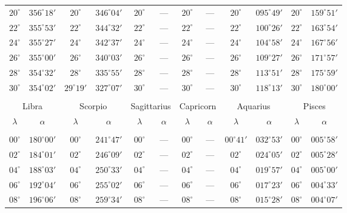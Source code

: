 \begin{table}[!h]
{\begin{tabular}{cc|cc|cc|cc|cc|cc}
$20^\circ$ & $356^\circ18'$ & $20^\circ$ & $346^\circ04'$ & $20^\circ$ & --- & $20^\circ$ & --- & $20^\circ$ & $095^\circ49'$ & $20^\circ$ & $159^\circ51'$\\
$22^\circ$ & $355^\circ53'$ & $22^\circ$ & $344^\circ32'$ & $22^\circ$ & --- & $22^\circ$ & --- & $22^\circ$ & $100^\circ26'$ & $22^\circ$ & $163^\circ54'$\\
$24^\circ$ & $355^\circ27'$ & $24^\circ$ & $342^\circ37'$ & $24^\circ$ & --- & $24^\circ$ & --- & $24^\circ$ & $104^\circ58'$ & $24^\circ$ & $167^\circ56'$\\
$26^\circ$ & $355^\circ00'$ & $26^\circ$ & $340^\circ03'$ & $26^\circ$ & --- & $26^\circ$ & --- & $26^\circ$ & $109^\circ27'$ & $26^\circ$ & $171^\circ57'$\\
$28^\circ$ & $354^\circ32'$ & $28^\circ$ & $335^\circ55'$ & $28^\circ$ & --- & $28^\circ$ & --- & $28^\circ$ & $113^\circ51'$ & $28^\circ$ & $175^\circ59'$\\
$30^\circ$ & $354^\circ02'$ & $29^\circ19'$ & $327^\circ07'$  & $30^\circ$ & --- & $30^\circ$ & --- & $30^\circ$ & $118^\circ13'$ & $30^\circ$ & $180^\circ00'$\\
\multicolumn{12}{c}{}\\
\multicolumn{2}{c}{Libra}\vline & \multicolumn{2}{c}{Scorpio} \vline& \multicolumn{2}{c}{Sagittarius} \vline& \multicolumn{2}{c}{Capricorn}\vline &
\multicolumn{2}{c}{Aquarius}\vline & \multicolumn{2}{c}{Pisces}\\\hline
$\lambda$& $\alpha$& $\lambda$& $\alpha$& $\lambda$& $\alpha$& $\lambda$& $\alpha$& $\lambda$& $\alpha$& $\lambda$& $\alpha$\\\hline
&&&&&&&&&&&\\[-2ex]
$00^\circ$ & $180^\circ00'$ & $00^\circ$ & $241^\circ47'$ & $00^\circ$ & --- & $00^\circ$ & --- &  $00^\circ41'$ & $032^\circ53'$ & $00^\circ$ & $005^\circ58'$\\
$02^\circ$ & $184^\circ01'$ & $02^\circ$ & $246^\circ09'$ & $02^\circ$ & --- & $02^\circ$ & --- &  $02^\circ$ & $024^\circ05'$ & $02^\circ$ & $005^\circ28'$\\
$04^\circ$ & $188^\circ03'$ & $04^\circ$ & $250^\circ33'$ & $04^\circ$ & --- & $04^\circ$ & --- &  $04^\circ$ & $019^\circ57'$ & $04^\circ$ & $005^\circ00'$\\
$06^\circ$ & $192^\circ04'$ & $06^\circ$ & $255^\circ02'$ & $06^\circ$ & --- & $06^\circ$ & --- &  $06^\circ$ & $017^\circ23'$ & $06^\circ$ & $004^\circ33'$\\
$08^\circ$ & $196^\circ06'$ & $08^\circ$ & $259^\circ34'$ & $08^\circ$ & --- & $08^\circ$ & --- &  $08^\circ$ & $015^\circ28'$ & $08^\circ$ & $004^\circ07'$\\

\end{tabular}}
\end{table}
